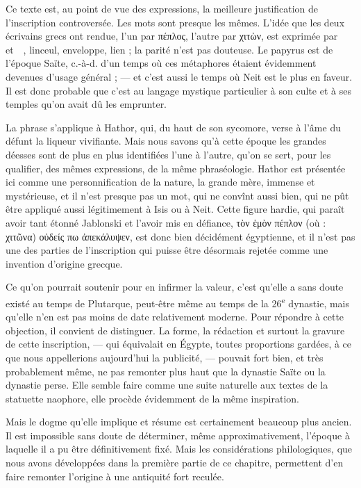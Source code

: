\documentclass[a4paper, 11pt, oneside]{article}
\newcommand*\hieroAAAH{}
\newcommand*\hieroAACM{}
\newcommand*\hieroAACS{}
\newcommand*\hieroAAEZ{}
\newcommand*\hieroAAFZ{\raisebox{0.5ex}{}}
\newcommand*\hieroAAHX{}
\newcommand*\hieroABIE{}
\newcommand*\hieroABIF{}
\begin{document}
Ce texte est, au point de vue des expressions, la meilleure justification de l'inscription controversée. Les mots sont presque les mêmes. L'idée que les deux écrivains grecs ont rendue, l'un par πέπλος, l'autre par χιτὼν, est exprimée par $\hieroABIE\:\hieroAAAH\allowbreak\:\hieroAACS\:\hieroAAFZ$ et $\hieroAAHX\:\hieroAAEZ\allowbreak\:\hieroAACM\:\hieroABIF$, linceul, enveloppe, lien ; la parité n'est pas douteuse. Le papyrus est de l'époque Saïte, c.-à-d. d'un temps où ces métaphores étaient évidemment devenues d'usage général ; --- et c'est aussi le temps où Neit est le plus en faveur. Il est donc probable que c'est au langage mystique particulier à son culte et à ses temples qu'on avait dû les emprunter.

La phrase s'applique à Hathor, qui, du haut de son sycomore, verse à l'âme du défunt la liqueur vivifiante. Mais nous savons qu'à cette époque les grandes déesses sont de plus en plus identifiées l'une à l'autre, qu'on se sert, pour les qualifier, des mêmes expressions, de la même phraséologie. Hathor est présentée ici comme une personnification de la nature, la grande mère, immense et mystérieuse, et il n'est presque pas un mot, qui ne convînt aussi bien, qui ne pût être appliqué aussi légitimement à Isis ou à Neit. Cette figure hardie, qui paraît avoir tant étonné Jablonski et l'avoir mis en défiance, τὸν ἑμὸν πέπλον (où : χιτῶνα) οὐδείς πω ἀπεκάλυψεν, est donc bien décidément égyptienne, et il n'est pas une des parties de l'inscription qui puisse être désormais rejetée comme une invention d'origine grecque.

Ce qu'on pourrait soutenir pour en infirmer la valeur, c'est qu'elle a sans doute existé au temps de Plutarque, peut-être même au temps de la 26\textsuperscript{e} dynastie, mais qu'elle n'en est pas moins de date relativement moderne. Pour répondre à cette objection, il convient de distinguer. La forme, la rédaction et surtout la gravure de cette inscription, --- qui équivalait en Égypte, toutes proportions gardées, à ce que nous appellerions aujourd'hui la publicité, --- pouvait fort bien, et très probablement même, ne pas remonter plus haut que la dynastie Saïte ou la dynastie perse. Elle semble faire comme une suite naturelle aux textes de la statuette naophore, elle procède évidemment de la même inspiration.

Mais le dogme qu'elle implique et résume est certainement beaucoup plus ancien. Il est impossible sans doute de déterminer, même approximativement, l'époque à laquelle il a pu être définitivement fixé. Mais les considérations philologiques, que nous avons développées dans la première partie de ce chapitre, permettent d'en faire remonter l'origine à une antiquité fort reculée.
\end{document}
